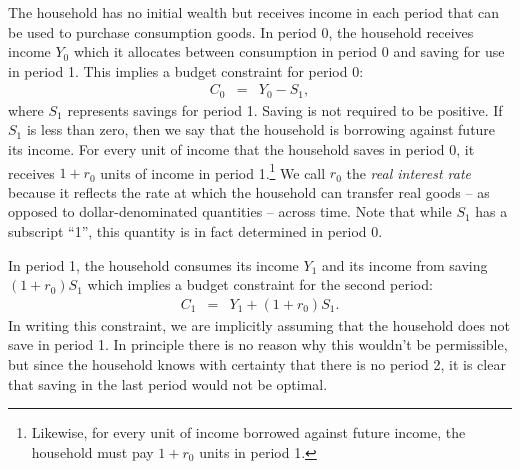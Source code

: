 \documentclass[12pt,fleqn]{article}
\newcommand{\EE}{\begin{eqnarray}}
\newcommand{\FF}{\end{eqnarray}}
\begin{document}
\begin{appendix}
\begin{figure}[h]
\begin{center}
	\end{center}
	\end{figure}

The household has no initial wealth but receives income in each period that can be used to purchase consumption goods. In period 0, the household receives income $Y_0$ which it allocates between consumption in period 0 and saving for use in period 1. This implies a budget constraint for period 0:
	\EE
	C_0 & = & Y_0 - S_1,  \label{eqn:two_per_bc0}
	\FF
where $S_1$ represents savings for period 1. Saving is not required to be positive. If $S_1$ is less than zero, then we say that the household is borrowing against future its income. For every unit of income that the household saves in period 0, it receives $1+r_0$ units of income in period 1.\footnote{Likewise, for every unit of income borrowed against future income, the household must pay $1+r_0$ units in period 1.} We call $r_0$ the \emph{real interest rate} because it reflects the rate at which the household can transfer real goods -- as opposed to dollar-denominated quantities -- across time. Note that while $S_1$ has a subscript ``1'',  this quantity is in fact determined in period 0. 

In period 1, the household consumes its income $Y_1$ and its income from saving $(1+r_0)S_1$ which implies a budget constraint for the second period:
	\EE
	C_1 & = & Y_1 + (1+r_0)S_1.  \label{eqn:two_per_bc1}
	\FF
In writing this constraint, we are implicitly assuming that the household does not save in period 1. In principle there is no reason why this wouldn't be permissible, but since the household knows with certainty that there is no period 2, it is clear that saving in the last period would not be optimal.


\end{appendix}
\end{document}
